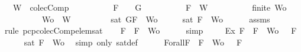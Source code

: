 \begin{isabellebody}
\ \ \ {\isachardoublequoteopen}W\ {\isasymin}\ colecComp{\isachardoublequoteclose}\isanewline
\ \ \ \ \ \ \ \ \ \ {\isachardoublequoteopen}F\ {\isacharequal}\ \isactrlbold {\isasymnot}\ {\isacharparenleft}\isactrlbold {\isasymnot}\ G{\isacharparenright}{\isachardoublequoteclose}\isanewline
\ \ \ \ \ \ \ \ \ \ {\isachardoublequoteopen}F\ {\isasymin}\ W{\isachardoublequoteclose}\isanewline
\ \ \ \ \ \ \ \ \ \ {\isachardoublequoteopen}finite\ Wo{\isachardoublequoteclose}\isanewline
\ \ \ \ \ \ \ \ \ \ {\isachardoublequoteopen}Wo\ {\isasymsubseteq}\ W{\isachardoublequoteclose}\isanewline
\ \ \ \ \ \ \ \ \ {\isachardoublequoteopen}sat\ {\isacharparenleft}{\isacharbraceleft}G{\isacharcomma}F{\isacharbraceright}\ {\isasymunion}\ Wo{\isacharparenright}{\isachardoublequoteclose}\isanewline
%
\isadelimproof
%
\endisadelimproof
%
\isatagproof
{}\isamarkupfalse%
\ {\isacharminus}\isanewline
\ \ \isamarkupfalse%
\ {\isachardoublequoteopen}sat\ {\isacharparenleft}{\isacharbraceleft}F{\isacharbraceright}\ {\isasymunion}\ Wo{\isacharparenright}{\isachardoublequoteclose}\isanewline
\ \ \ \ \isamarkupfalse%
\ assms{\isacharparenleft}{}{\isacharcomma}{}{\isacharcomma}{}{\isacharcomma}{}{\isacharparenright}\ \isamarkupfalse%
\ {\isacharparenleft}rule\ pcp{\isacharunderscore}colecComp{\isacharunderscore}elem{\isacharunderscore}sat{\isacharparenright}\isanewline
\ \ \isamarkupfalse%
\ {\isachardoublequoteopen}F\ {\isasymin}\ {\isacharbraceleft}F{\isacharbraceright}\ {\isasymunion}\ Wo{\isachardoublequoteclose}\isanewline
\ \ \ \ \isamarkupfalse%
\ simp\ \isanewline
\ \ \isamarkupfalse%
\ Ex{}{\isacharcolon}{\isachardoublequoteopen}{\isasymexists}{\isasymA}{\isachardot}\ {\isasymforall}F\ {\isasymin}\ {\isacharparenleft}{\isacharbraceleft}F{\isacharbraceright}\ {\isasymunion}\ Wo{\isacharparenright}{\isachardot}\ {\isasymA}\ {\isasymTurnstile}\ F{\isachardoublequoteclose}\isanewline
\ \ \ \ \isamarkupfalse%
\ {\isacartoucheopen}sat\ {\isacharparenleft}{\isacharbraceleft}F{\isacharbraceright}\ {\isasymunion}\ Wo{\isacharparenright}{\isacartoucheclose}\ \isamarkupfalse%
\ {\isacharparenleft}simp\ only{\isacharcolon}\ sat{\isacharunderscore}def{\isacharparenright}\isanewline
\ \ \isamarkupfalse%
\ {\isasymA}\ \ Forall{}{\isacharcolon}{\isachardoublequoteopen}{\isasymforall}F\ {\isasymin}\ {\isacharparenleft}{\isacharbraceleft}F{\isacharbraceright}\ {\isasymunion}\ Wo{\isacharparenright}{\isachardot}\ {\isasymA}\ {\isasymTurnstile}\ F{\isachardoublequoteclose}\isanewline

\end{isabellebody}
